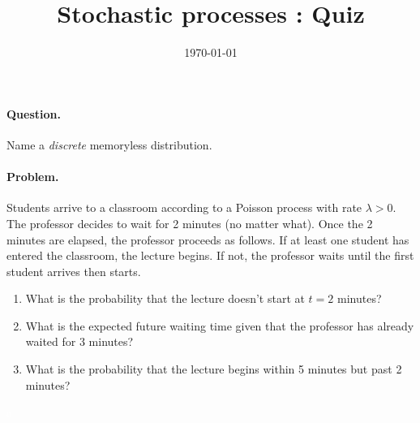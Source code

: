 \documentclass[12pt,a4paper]{article}
\title{ \bfseries \Huge {Stochastic processes : Quiz}}
\date{\today}
\newcounter{num}  %
\begin{document}
	\maketitle

\paragraph{Question.} Name a \textit{discrete} memoryless distribution.
  
\vspace{1cm}   
\paragraph{Problem.}
Students arrive to a classroom according to a Poisson process with rate $\lambda>0$.
The professor decides to wait for 2 minutes (no matter what).
 Once the 2 minutes are elapsed, the professor proceeds as follows.
 If at least one student has entered the classroom, the lecture begins. 
 If not, the professor waits until the first student arrives then starts.
\begin{enumerate}
\item What is the probability that the lecture doesn't start at $t = 2$ minutes?
\vspace{5cm}
\item What is the expected future waiting time given that the professor has already waited for 3 minutes?
\vspace{5cm}
\item What is the probability that the lecture begins within 5 minutes but past 2 minutes?
\vspace{5cm}
\end{enumerate}
\newpage

\textcolor{white}{a}

\vspace{24cm}

\end{document}
